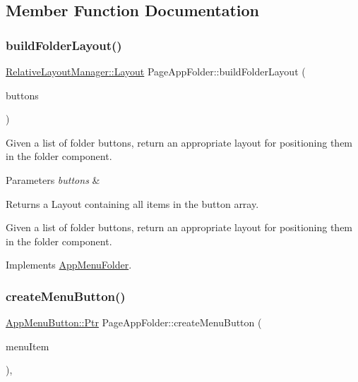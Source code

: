 \subsection{Member Function Documentation}
\mbox{\label{classPageAppFolder_a24e2bcf990a45c7c45ee1bf04140d46b}} 
\subsubsection{\texorpdfstring{build\+Folder\+Layout()}{buildFolderLayout()}}
{\footnotesize\ttfamily \mbox{\hyperlink{classRelativeLayoutManager_a3dcd4cd0bc41754f3b4a64bc29b5eca5}{Relative\+Layout\+Manager\+::\+Layout}} Page\+App\+Folder\+::build\+Folder\+Layout (\begin{DoxyParamCaption}\item[{Array$<$ \mbox{\hyperlink{classAppMenuButton_aeb692efb6a933970de8eac14e5e71544}{App\+Menu\+Button\+::\+Ptr}} $>$ \&}]{buttons }\end{DoxyParamCaption})\hspace{0.3cm}{\ttfamily [virtual]}}

Given a list of folder buttons, return an appropriate layout for positioning them in the folder component.


\begin{DoxyParams}{Parameters}
{\em buttons} & \\
\hline
\end{DoxyParams}
\begin{DoxyReturn}{Returns}
a Layout containing all items in the button array.
\end{DoxyReturn}
Given a list of folder buttons, return an appropriate layout for positioning them in the folder component. 

Implements \mbox{\hyperlink{classAppMenuFolder}{App\+Menu\+Folder}}.

\mbox{\label{classPageAppFolder_a1f26a965194bf0e14503823971f21ec4}} 
\subsubsection{\texorpdfstring{create\+Menu\+Button()}{createMenuButton()}}
{\footnotesize\ttfamily \mbox{\hyperlink{classAppMenuButton_aeb692efb6a933970de8eac14e5e71544}{App\+Menu\+Button\+::\+Ptr}} Page\+App\+Folder\+::create\+Menu\+Button (\begin{DoxyParamCaption}\item[{\mbox{\hyperlink{classAppMenuItem_ab5f51c5d74f8df62b8862c0cc8126cb7}{App\+Menu\+Item\+::\+Ptr}}}]{menu\+Item }\end{DoxyParamCaption})\hspace{0.3cm}{\ttfamily [override]}, {\ttfamily [virtual]}}

